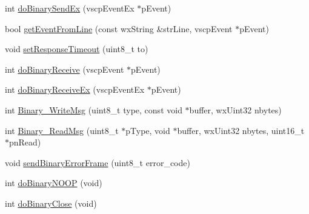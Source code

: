 \begin{DoxyCompactItemize}
\item 
int \hyperlink{class_vscp_tcp_if_a29e8e311e82e1944b683b2e9428f1558}{doBinarySendEx} (vscpEventEx $\ast$pEvent)
\item 
bool \hyperlink{class_vscp_tcp_if_ad3775ac8feeeb89afefd1f395b7e77fd}{getEventFromLine} (const wxString \&strLine, vscpEvent $\ast$pEvent)
\item 
void \hyperlink{class_vscp_tcp_if_a3024f961bd53b6c89d88b2899b421873}{setResponseTimeout} (uint8\_\-t to)
\item 
int \hyperlink{class_vscp_tcp_if_a4784339afab93999ab5373804bbb75b7}{doBinaryReceive} (vscpEvent $\ast$pEvent)
\item 
int \hyperlink{class_vscp_tcp_if_a57755b69a4731d0b5c66be8570641848}{doBinaryReceiveEx} (vscpEventEx $\ast$pEvent)
\item 
int \hyperlink{class_vscp_tcp_if_a9a0b3edc90cc642b2ac7fd5af20b1fe7}{Binary\_\-WriteMsg} (uint8\_\-t type, const void $\ast$buffer, wxUint32 nbytes)
\item 
int \hyperlink{class_vscp_tcp_if_a40cfe041ad1bde5c3e5a1575c1febf86}{Binary\_\-ReadMsg} (uint8\_\-t $\ast$pType, void $\ast$buffer, wxUint32 nbytes, uint16\_\-t $\ast$pnRead)
\item 
void \hyperlink{class_vscp_tcp_if_a7204ea3b4eeab16139de4ecdd4cbaca0}{sendBinaryErrorFrame} (uint8\_\-t error\_\-code)
\item 
int \hyperlink{class_vscp_tcp_if_aad6dc73959c54617f4b0047e58f4e8d0}{doBinaryNOOP} (void)
\item 
int \hyperlink{class_vscp_tcp_if_a745a407972f75e1f10d40ced499752f5}{doBinaryClose} (void)
\end{DoxyCompactItemize}
